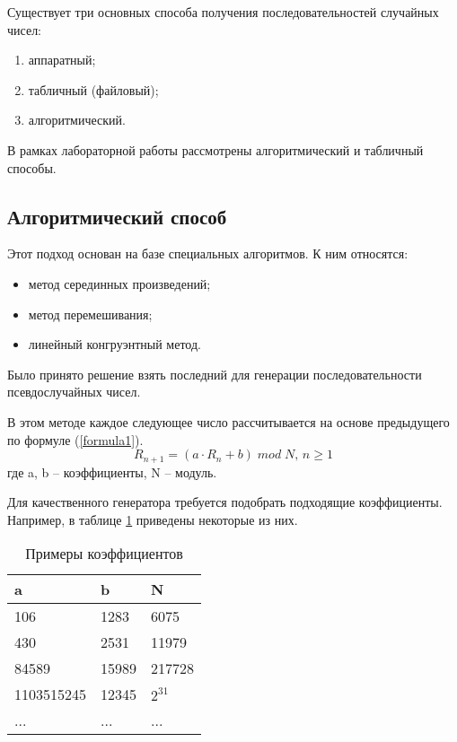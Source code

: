 Существует три основных способа получения последовательностей случайных чисел:
\begin{enumerate}
	\item аппаратный;
	
	\item табличный (файловый);
	
	\item алгоритмический.
\end{enumerate}

В рамках лабораторной работы рассмотрены алгоритмический и табличный способы. 

\subsection{Алгоритмический способ}
Этот подход основан на базе специальных алгоритмов. К ним относятся:
\begin{itemize}
	\item метод серединных произведений;
	
	\item метод перемешивания;
	
	\item линейный конгруэнтный метод.
\end{itemize}

Было принято решение взять последний для генерации последовательности псевдослучайных чисел.

В этом методе каждое следующее число рассчитывается на основе предыдущего по формуле (\ref{formula1}).
\begin{equation}\label{formula1}
	R_{n + 1} = (a \cdot R_n + b)\;mod\;N,\, n \geq 1
\end{equation}
где a, b -- коэффициенты, N -- модуль.

Для качественного генератора требуется подобрать подходящие коэффициенты. Например, в таблице \ref{k} приведены некоторые из них.
\begin{table}[h]
	\begin{center}
		\caption{Примеры коэффициентов}
		\label{k}
		\begin{tabular}{| p{3cm} | p{3cm} | p{3cm}|}
			\hline
			\textbf{a} 			& \textbf{b} 	& \textbf{N} \\
			\hline
			106 				& 1283 			& 6075 \\ 
			\hline
			430 				& 2531  		& 11979 \\ 
			\hline
			84589 				& 15989 		& 217728 \\ 
			\hline
			1103515245 			& 12345 		& $2^{31}$ \\ 
			\hline
			... 				& ... 			& ... \\ 
			\hline
		\end{tabular}
	\end{center}
\end{table} 

